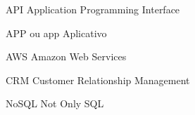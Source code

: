 \begin{siglas}
  \item[API] Application Programming Interface
  \item[APP ou app] Aplicativo
  \item[AWS] Amazon Web Services
  \item[CRM] Customer Relationship Management
  \item[NoSQL] Not Only SQL
\end{siglas}
